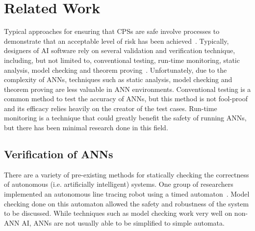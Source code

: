 \section{Related Work}
\label{sec:related}


Typical approaches for ensuring that \acp{CPS} are safe involve processes to demonstrate that an acceptable level of risk has been achieved~\cite{scann}. 
Typically, designers of \ac{AI} software rely on several validation and verification technique, including, but not limited to, conventional testing, run-time monitoring, static analysis, model checking and theorem proving~\cite{menzies2005verification}.
Unfortunately, due to the complexity of \acfp{ANN}, techniques such as static analysis, model checking and theorem proving are less valuable in \ac{ANN} environments. 
Conventional testing is a common method to test the accuracy of \acp{ANN}, but this method is not fool-proof and its efficacy relies heavily on the creator of the test cases.
Run-time monitoring is a technique that could greatly benefit the safety of running \acp{ANN}, but there has been minimal research done in this field.


\subsection{Verification of \acp{ANN}}
There are a variety of pre-existing methods for statically checking the correctness of autonomous (i.e. artificially intelligent) systems.
One group of researchers implemented an autonomous line tracing robot using a timed automaton~\cite{timed-enf-autonomous}.
Model checking done on this automaton allowed the safety and robustness of the system to be discussed.
While techniques such as model checking work very well on non-\ac{ANN} \ac{AI}, \acp{ANN} are not usually able to be simplified to simple automata.

